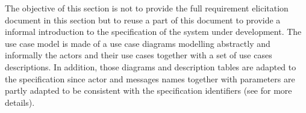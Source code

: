 The objective of this section is not to provide the full requirement elicitation
document in this section but to reuse a part of this document to provide a
informal introduction to the \msrmessir specification of the system under
development. The use case model is made of a use case diagrams modelling
abstractly and informally the actors and their use cases together with a set of
use cases descriptions.
In addition, those diagrams and description tables are adapted to the \msrmessir
specification since actor and messages names together with parameters are partly
adapted to be consistent with the specification identifiers (see
\cite{messirbook} for more details).


